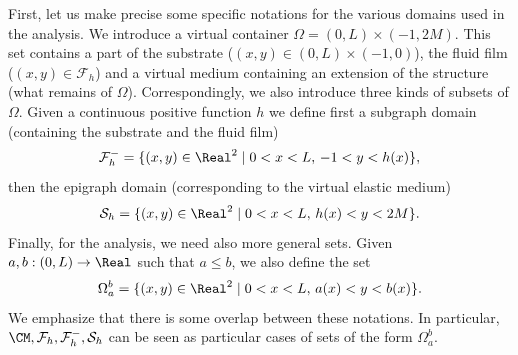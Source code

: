 First, let us make precise some specific notations for the various domains used in the analysis. We introduce a virtual container $\Omega = (0,L) \times (-1,2M)$. This set contains a part of the substrate ($(x,y) \in (0,L) \times (-1,0)$), the fluid film
($(x,y) \in \mathcal F_h$) and a virtual medium containing an extension of the structure (what remains of $\Omega$).
Correspondingly, we also introduce three kinds of subsets of $\Omega$. Given a continuous positive function $h$ we define first a subgraph domain (containing the substrate and the fluid film)
\[\mathcal{F}^-_{h}=\{(x,y)\in\Real^{2}\mid 0<x<L,\,-1<y<h(x)\},\]
then the epigraph domain (corresponding to the virtual elastic medium)
\[\mathcal{S}_{h}=\{(x,y)\in\Real^{2}\mid 0<x<L,\,h(x)<y<2M\}.\]
Finally, for the analysis, we need also more general sets. Given $a,b:(0,L)\to \Real$ such that $a \leq b$,
we also define the set
\[\Omega_{a}^{b}=\{(x,y)\in\Real^{2}\mid 0<x<L,\,a(x)<y<b(x)\}.\]
We emphasize that there is some overlap between these notations.
In particular, $\CM, \mathcal{F}_{h}, \mathcal{F}^-_{h}, \mathcal{S}_{h}$ can be seen as particular cases of sets of the form $\Omega_{a}^{b}$.

